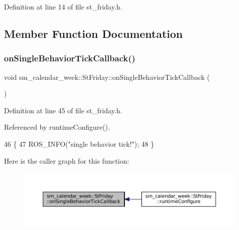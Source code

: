 Definition at line 14 of file st\+\_\+friday.\+h.



\subsection{Member Function Documentation}
\mbox{\label{structsm__calendar__week_1_1StFriday_a3d697235b90c176eb1524cd76c2d628f}} 
\subsubsection{\texorpdfstring{on\+Single\+Behavior\+Tick\+Callback()}{onSingleBehaviorTickCallback()}}
{\footnotesize\ttfamily void sm\+\_\+calendar\+\_\+week\+::\+St\+Friday\+::on\+Single\+Behavior\+Tick\+Callback (\begin{DoxyParamCaption}{ }\end{DoxyParamCaption})\hspace{0.3cm}{\ttfamily [inline]}}



Definition at line 45 of file st\+\_\+friday.\+h.



Referenced by runtime\+Configure().


\begin{DoxyCode}
46     \{
47         ROS\_INFO(\textcolor{stringliteral}{"single behavior tick!"});
48     \}
\end{DoxyCode}
Here is the caller graph for this function\+:
\nopagebreak
\begin{figure}[H]
\begin{center}
\leavevmode
\includegraphics[width=350pt]{structsm__calendar__week_1_1StFriday_a3d697235b90c176eb1524cd76c2d628f_icgraph}
\end{center}
\end{figure}
\mbox{\label{structsm__calendar__week_1_1StFriday_a79317a2a67708590e046d49627a30a55}} 
